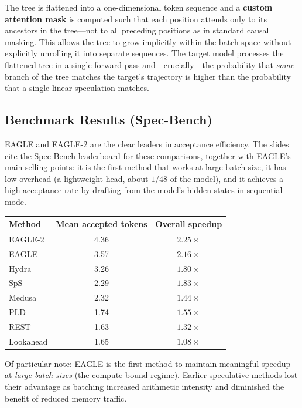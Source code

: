 \documentclass[11pt,a4paper]{article}
\theoremstyle{definition}
\theoremstyle{remark}
\theoremstyle{plain}
\begin{document}
The tree is flattened into a one-dimensional token sequence and a
\textbf{custom attention mask} is computed such that each position attends
only to its ancestors in the tree---not to all preceding positions as in
standard causal masking. This allows the tree to grow implicitly within
the batch space without explicitly unrolling it into separate sequences.
The target model processes the flattened tree in a single forward pass
and---crucially---the probability that \emph{some} branch of the tree
matches the target's trajectory is higher than the probability that a
single linear speculation matches.

\subsection{Benchmark Results (Spec-Bench)}

EAGLE and EAGLE-2 are the clear leaders in acceptance efficiency. The
slides cite the
\href{https://github.com/hemingkx/Spec-Bench/blob/main/Leaderboard.md}{Spec-Bench
leaderboard} for these comparisons, together with EAGLE's main selling
points: it is the first method that works at large batch size, it has low
overhead (a lightweight head, about $1/48$ of the model), and it achieves a
high acceptance rate by drafting from the model's hidden states in
sequential mode.

\begin{center}
\renewcommand{\arraystretch}{1.25}
\begin{tabular}{@{}lcc@{}}
\toprule
\textbf{Method} & \textbf{Mean accepted tokens} & \textbf{Overall speedup} \\
\midrule
EAGLE-2    & 4.36 & $2.25\times$ \\
EAGLE      & 3.57 & $2.16\times$ \\
Hydra      & 3.26 & $1.80\times$ \\
SpS        & 2.29 & $1.83\times$ \\
Medusa     & 2.32 & $1.44\times$ \\
PLD        & 1.74 & $1.55\times$ \\
REST       & 1.63 & $1.32\times$ \\
Lookahead  & 1.65 & $1.08\times$ \\
\bottomrule
\end{tabular}
\end{center}

Of particular note: EAGLE is the first method to maintain meaningful
speedup at \emph{large batch sizes} (the compute-bound regime). Earlier
speculative methods lost their advantage as batching increased arithmetic
intensity and diminished the benefit of reduced memory traffic.
\end{document}
